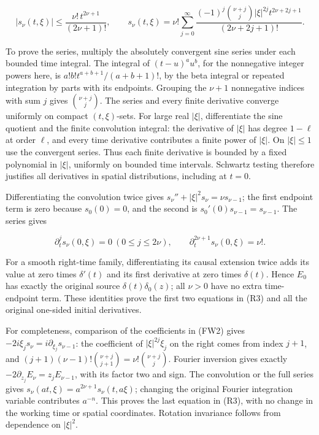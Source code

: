 \documentclass[
  11pt,
]{article}
\begin{document}
\[
 |s_\nu(t,\xi)|\leq\frac{\nu!\,t^{2\nu+1}}{(2\nu+1)!},\qquad
 s_\nu(t,\xi)=\nu!\sum_{j=0}^{\infty}
   \frac{(-1)^j\binom{\nu+j}{j}|\xi|^{2j}
               t^{2\nu+2j+1}}{(2\nu+2j+1)!} .\tag{FW2}
\]

To prove the series, multiply the absolutely convergent sine series
under each bounded time integral. The integral of \((t-u)^a u^b\), for
the nonnegative integer powers here, is \(a!b!t^{a+b+1}/(a+b+1)!\), by
the beta integral or repeated integration by parts with its endpoints.
Grouping the \(\nu+1\) nonnegative indices with sum \(j\) gives
\(\binom{\nu+j}{j}\). The series and every finite derivative converge
uniformly on compact \((t,\xi)\)-sets. For large real \(|\xi|\),
differentiate the sine quotient and the finite convolution integral: the
derivative of \(|\xi|\) has degree \(1-\ell\) at order \(\ell\), and
every time derivative contributes a finite power of \(|\xi|\). On
\(|\xi|\leq1\) use the convergent series. Thus each finite derivative is
bounded by a fixed polynomial in \(|\xi|\), uniformly on bounded time
intervals. Schwartz testing therefore justifies all derivatives in
spatial distributions, including at \(t=0\).

Differentiating the convolution twice gives
\(s_\nu''+|\xi|^2s_\nu=\nu s_{\nu-1}\); the first endpoint term is zero
because \(s_0(0)=0\), and the second is \(s_0'(0)s_{\nu-1}=s_{\nu-1}\).
The series gives

\[
 \partial_t^j s_\nu(0,\xi)=0\ (0\leq j\leq2\nu),\qquad
 \partial_t^{2\nu+1}s_\nu(0,\xi)=\nu! .\tag{FW3}
\]

For a smooth right-time family, differentiating its causal extension
twice adds its value at zero times \(\delta'(t)\) and its first
derivative at zero times \(\delta(t)\). Hence \(E_0\) has exactly the
original source \(\delta(t)\delta_0(z)\); all \(\nu>0\) have no extra
time-endpoint term. These identities prove the first two equations in
(R3) and all the original one-sided initial derivatives.

For completeness, comparison of the coefficients in (FW2) gives
\(-2i\xi_j s_\nu=i\partial_{\xi_j}s_{\nu-1}\): the coefficient of
\(|\xi|^{2j}\xi_j\) on the right comes from index \(j+1\), and
\((j+1)(\nu-1)!\binom{\nu+j}{j+1}=\nu!\binom{\nu+j}{j}\). Fourier
inversion gives exactly \(-2\partial_{z_j}E_\nu=z_jE_{\nu-1}\), with its
factor two and sign. The convolution or the full series gives
\(s_\nu(at,\xi)=a^{2\nu+1}s_\nu(t,a\xi)\); changing the original Fourier
integration variable contributes \(a^{-n}\). This proves the last
equation in (R3), with no change in the working time or spatial
coordinates. Rotation invariance follows from dependence on \(|\xi|^2\).
\end{document}
